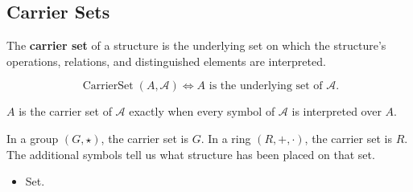 \subsection{Carrier Sets}
\label{subsec:carrier-sets}

\begin{definition}
\label{def:carrier-set}
The \textbf{carrier set} of a structure is the underlying set on which the
structure's operations, relations, and distinguished elements are interpreted.
\end{definition}

\begin{remark*}
\[
\operatorname{CarrierSet}(A,\mathcal{A})
\Longleftrightarrow
A \text{ is the underlying set of } \mathcal{A}.
\]
\end{remark*}

\begin{remark*}
$A$ is the carrier set of $\mathcal{A}$ exactly when every symbol of
$\mathcal{A}$ is interpreted over $A$.
\end{remark*}


\begin{remark*}[Interpretation]
In a group $(G,\star)$, the carrier set is $G$.  In a ring $(R,+,\cdot)$, the
carrier set is $R$.  The additional symbols tell us what structure has been
placed on that set.
\end{remark*}

\begin{remark*}[Dependencies]
\begin{itemize}
  \item Set.
\end{itemize}
\end{remark*}
